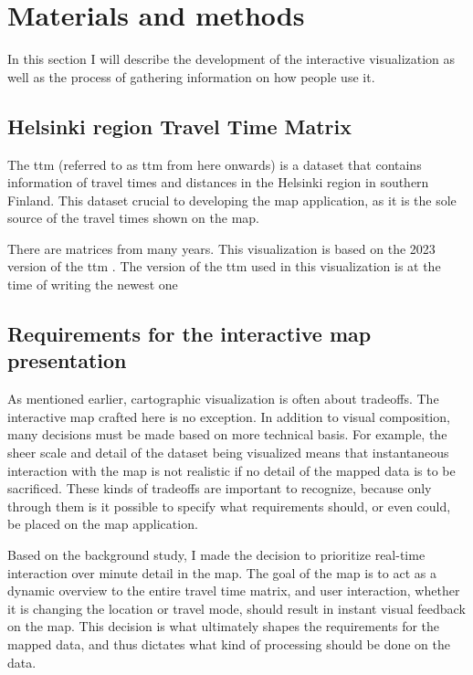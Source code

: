 \section{Materials and methods}
In this section I will describe the development of the interactive visualization
as well as the process of gathering information on how people use it.

\subsection{Helsinki region Travel Time Matrix}
The \acrlong{ttm} (referred to as \acrshort{ttm} from here onwards)
is a dataset that contains information of travel times and distances
in the Helsinki region in southern Finland.
This dataset crucial to developing the map application,
as it is the sole source of the travel times shown on the map.


There are matrices from many years.
This visualization is based on the 2023 version of the \acrshort{ttm}
\parencite{fin2023}.
The version of the \acrshort{ttm} used in this visualization is at the time of writing the newest one



\subsection{Requirements for the interactive map presentation}

As mentioned earlier, cartographic visualization is often about tradeoffs.
The interactive map crafted here is no exception.
In addition to visual composition,  %
many decisions must be made based on more technical basis.
For example, the sheer scale and detail of the dataset being visualized
means that instantaneous interaction with the map is not realistic
if no detail of the mapped data is to be sacrificed.
These kinds of tradeoffs are important to recognize,
because only through them is it possible to specify what
requirements should, or even could, be placed on the map application.

Based on the background study,  %
I made the decision to prioritize real-time interaction over minute detail in the map.
The goal of the map is to act as a dynamic overview to the entire travel time matrix,
and user interaction, whether it is changing the location or travel mode,
should result in instant visual feedback on the map.
This decision is what ultimately shapes the requirements for the mapped data,
and thus dictates what kind of processing should be done on the data.


